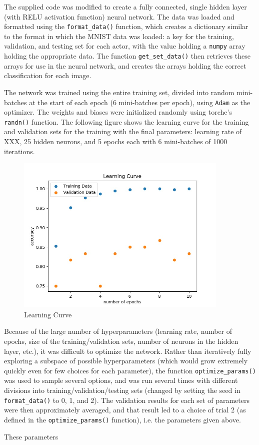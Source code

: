 \documentclass{article}
\begin{document}
   The supplied code was modified to create a fully connected, single hidden layer (with RELU
   activation function) neural network. The data was loaded and formatted using the \texttt{format\_data()}
   function, which creates a dictionary similar to the format in which the MNIST data was loaded:
   a key for the training, validation, and testing set for each actor, with the value holding a
   \texttt{numpy} array holding the appropriate data.
   The function \texttt{get\_set\_data()} then retrieves these arrays for use in the neural network,
   and creates the arrays holding the correct classification for each image.

   The network was trained using the entire training set, divided into random mini-batches at the
   start of each epoch (6 mini-batches per epoch), using \texttt{Adam} as the optimizer.
   The weights and biases were initialized randomly using torche's \texttt{randn()} function.
   The following figure shows the learning curve for the training and validation sets for the training
   with the final parameters: learning rate of XXX, 25 hidden neurons, and 5 epochs each with 6 mini-batches
   of 1000 iterations.
      \begin{figure}[h] \centering
         \includegraphics[width=4in]{resources/part8}
         \caption{Learning Curve}
       \end{figure}

   Because of the large number of hyperparameters (learning rate, number of epochs, size of the
   training/validation sets, number of neurons in the hidden layer, etc.), it was difficult to
   optimize the network.
   Rather than iteratively fully exploring a subspace of possible hyperparameters (which would grow
   extremely quickly even for few choices for each parameter), the function \texttt{optimize\_params()}
   was used to sample several options, and was run several times with different divisions into
   training/validation/testing sets (changed by setting the seed in \texttt{format\_data()} to 0, 1, and 2).
   The validation results for each set of parameters were then approximately averaged, and that result
   led to a choice of trial 2 (as defined in the \texttt{optimize\_params()} function), i.e. the parameters
   given above.

   These parameters
\end{document}
